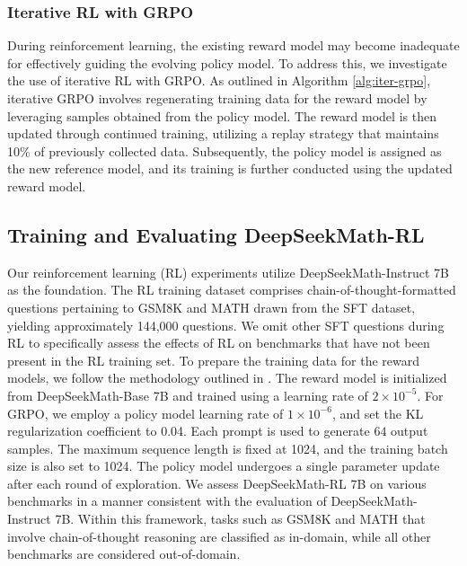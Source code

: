 \begin{itemize}[topsep=0pt]
\begin{itemize}[topsep=0pt]
\subsubsection{Iterative RL with GRPO} During reinforcement learning, the existing reward model may become inadequate for effectively guiding the evolving policy model. To address this, we investigate the use of iterative RL with GRPO. As outlined in Algorithm \ref{alg:iter-grpo}, iterative GRPO involves regenerating training data for the reward model by leveraging samples obtained from the policy model. The reward model is then updated through continued training, utilizing a replay strategy that maintains 10\% of previously collected data. Subsequently, the policy model is assigned as the new reference model, and its training is further conducted using the updated reward model.

\subsection{Training and Evaluating DeepSeekMath-RL}

Our reinforcement learning (RL) experiments utilize DeepSeekMath-Instruct 7B as the foundation. The RL training dataset comprises chain-of-thought-formatted questions pertaining to GSM8K and MATH drawn from the SFT dataset, yielding approximately 144,000 questions. We omit other SFT questions during RL to specifically assess the effects of RL on benchmarks that have not been present in the RL training set. To prepare the training data for the reward models, we follow the methodology outlined in \citep{wang2023math}. The reward model is initialized from DeepSeekMath-Base 7B and trained using a learning rate of $2 \times 10^{-5}$. For GRPO, we employ a policy model learning rate of $1 \times 10^{-6}$, and set the KL regularization coefficient to 0.04. Each prompt is used to generate $64$ output samples. The maximum sequence length is fixed at 1024, and the training batch size is also set to 1024. The policy model undergoes a single parameter update after each round of exploration. We assess DeepSeekMath-RL 7B on various benchmarks in a manner consistent with the evaluation of DeepSeekMath-Instruct 7B. Within this framework, tasks such as GSM8K and MATH that involve chain-of-thought reasoning are classified as in-domain, while all other benchmarks are considered out-of-domain.


\end{itemize}
\end{itemize}
